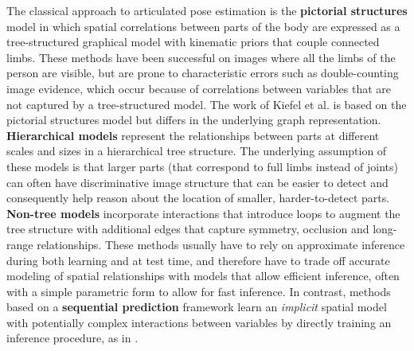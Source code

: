 \documentclass[10pt,twocolumn,letterpaper]{article}
\begin{document}
The classical approach to articulated pose estimation is the \textbf{pictorial structures} model \cite{fh2005pictorial,ramanan2005strike,Andriluka2010,Andriluka2009,pishchulin13iccv,pishchulin2013poselet,yang2011articulated,johnson2010clustered} in which spatial correlations between parts of the body are expressed as a tree-structured graphical model with kinematic priors that couple connected limbs. These methods have been successful on images where all the limbs of the person are visible, but are prone to characteristic errors such as double-counting image evidence, which occur because of correlations between variables that are not captured by a tree-structured model. The work of Kiefel et al. \cite{kiefel2014human} is based on the pictorial structures model but differs in the underlying graph representation. \textbf{Hierarchical models}\cite{tian2012exploring,sun2011articulated} represent the relationships between parts at different scales and sizes in a hierarchical tree structure. The underlying assumption of these models is that larger parts (that correspond to full limbs instead of joints) can often have discriminative image structure that can be easier to detect and consequently help reason about the location of smaller, harder-to-detect parts. 
\textbf{Non-tree models}\cite{wang2008multiple,sigal2006measure,lan2005beyond,karlinsky2012using,Dantone2013} incorporate interactions that introduce loops to augment the tree structure with additional edges that capture symmetry, occlusion and long-range relationships. These methods usually have to rely on approximate inference during both learning and at test time, and therefore have to trade off accurate modeling of spatial relationships with models that allow efficient inference, often with a simple parametric form to allow for fast inference. In contrast, methods based on a \textbf{sequential prediction} framework \cite{Ramakrishna2014posemachines} learn an \emph{implicit} spatial model with potentially complex interactions between variables by directly training an inference procedure, as in \cite{munoz2010,ross2011,tu2010PAMI,Pinheiro14recurrentconvolutional}. 
%
\end{document}
